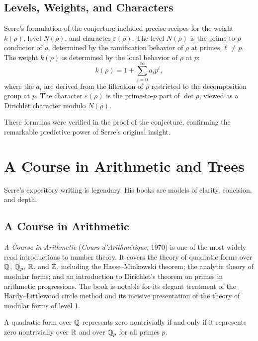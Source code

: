 \subsection{Levels, Weights, and Characters}

Serre's formulation of the conjecture included precise recipes for the weight \(k(\rho)\), level \(N(\rho)\), and character \(\varepsilon(\rho)\). The level \(N(\rho)\) is the prime-to-\(p\) conductor of \(\rho\), determined by the ramification behavior of \(\rho\) at primes \(\ell \neq p\). The weight \(k(\rho)\) is determined by the local behavior of \(\rho\) at \(p\):
\[
k(\rho) = 1 + \sum_{i=0}^\infty a_i p^i,
\]
where the \(a_i\) are derived from the filtration of \(\rho\) restricted to the decomposition group at \(p\). The character \(\varepsilon(\rho)\) is the prime-to-\(p\) part of \(\det\rho\), viewed as a Dirichlet character modulo \(N(\rho)\).

These formulas were verified in the proof of the conjecture, confirming the remarkable predictive power of Serre's original insight.

\section{A Course in Arithmetic and Trees}

Serre's expository writing is legendary. His books are models of clarity, concision, and depth.

\subsection{A Course in Arithmetic}

\textit{A Course in Arithmetic} (\textit{Cours d'Arithm\'etique}, 1970) is one of the most widely read introductions to number theory. It covers the theory of quadratic forms over \(\mathbb{Q}\), \(\mathbb{Q}_p\), \(\mathbb{R}\), and \(\mathbb{Z}\), including the Hasse--Minkowski theorem; the analytic theory of modular forms; and an introduction to Dirichlet's theorem on primes in arithmetic progressions. The book is notable for its elegant treatment of the Hardy--Littlewood circle method and its incisive presentation of the theory of modular forms of level 1.

\begin{theorem}
A quadratic form over \(\mathbb{Q}\) represents zero nontrivially if and only if it represents zero nontrivially over \(\mathbb{R}\) and over \(\mathbb{Q}_p\) for all primes \(p\).
\end{theorem}

